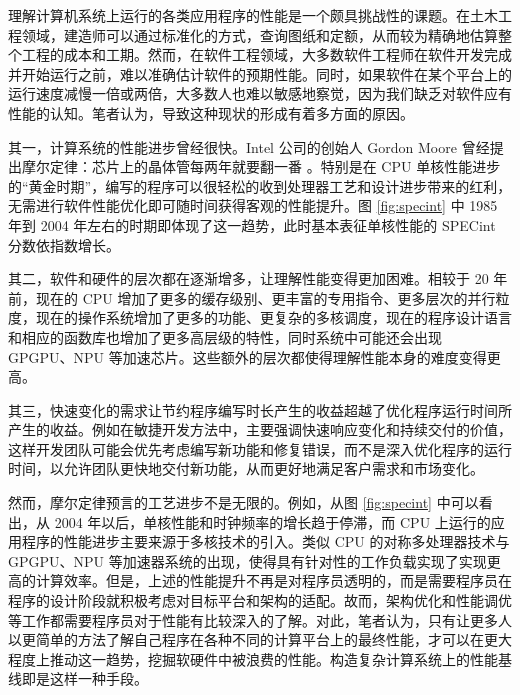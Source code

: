 
理解计算机系统上运行的各类应用程序的性能是一个颇具挑战性的课题。在土木工程领域，建造师可以通过标准化的方式，查询图纸和定额，从而较为精确地估算整个工程的成本和工期。然而，在软件工程领域，大多数软件工程师在软件开发完成并开始运行之前，难以准确估计软件的预期性能。同时，如果软件在某个平台上的运行速度减慢一倍或两倍，大多数人也难以敏感地察觉，因为我们缺乏对软件应有性能的认知。笔者认为，导致这种现状的形成有着多方面的原因。


其一，计算系统的性能进步曾经很快。Intel 公司的创始人 Gordon Moore 曾经提出摩尔定律：芯片上的晶体管每两年就要翻一番 \cite{MooreLaw}。特别是在 CPU 单核性能进步的“黄金时期”，编写的程序可以很轻松的收到处理器工艺和设计进步带来的红利，无需进行软件性能优化即可随时间获得客观的性能提升。图 \ref{fig:specint} 中 1985 年到 2004 年左右的时期即体现了这一趋势，此时基本表征单核性能的 SPECint 分数依指数增长。

其二，软件和硬件的层次都在逐渐增多，让理解性能变得更加困难。相较于 20 年前，现在的 CPU 增加了更多的缓存级别、更丰富的专用指令、更多层次的并行粒度，现在的操作系统增加了更多的功能、更复杂的多核调度，现在的程序设计语言和相应的函数库也增加了更多高层级的特性，同时系统中可能还会出现 GPGPU、NPU 等加速芯片。这些额外的层次都使得理解性能本身的难度变得更高。

其三，快速变化的需求让节约程序编写时长产生的收益超越了优化程序运行时间所产生的收益。例如在敏捷开发方法中，主要强调快速响应变化和持续交付的价值，这样开发团队可能会优先考虑编写新功能和修复错误，而不是深入优化程序的运行时间，以允许团队更快地交付新功能，从而更好地满足客户需求和市场变化。

然而，摩尔定律预言的工艺进步不是无限的。例如，从图 \ref{fig:specint} 中可以看出，从 2004 年以后，单核性能和时钟频率的增长趋于停滞，而 CPU 上运行的应用程序的性能进步主要来源于多核技术的引入。类似 CPU 的对称多处理器技术与 GPGPU、NPU 等加速器系统的出现，使得具有针对性的工作负载实现了实现更高的计算效率。但是，上述的性能提升不再是对程序员透明的，而是需要程序员在程序的设计阶段就积极考虑对目标平台和架构的适配。故而，架构优化和性能调优等工作都需要程序员对于性能有比较深入的了解。对此，笔者认为，只有让更多人以更简单的方法了解自己程序在各种不同的计算平台上的最终性能，才可以在更大程度上推动这一趋势，挖掘软硬件中被浪费的性能。构造复杂计算系统上的性能基线即是这样一种手段。

